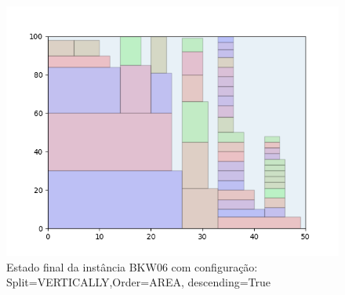 \begin{figure}[H]
    \centering
    \caption[]{Estado final da instância BKW06 com configuração: Split=VERTICALLY,Order=AREA, descending=True}
    \label{fig:bkw06-vertically-area-true}
    \includegraphics[scale=0.5]{output/figures/bkw/bkw06/vertically/area/true/00}
\end{figure}